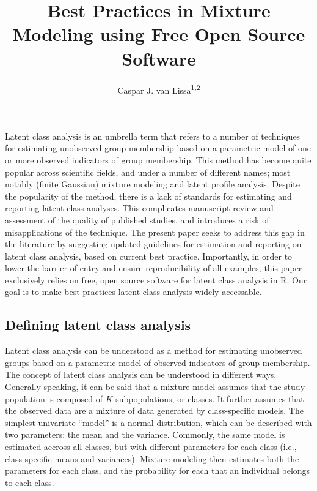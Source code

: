 \documentclass[
  ,man]{apa6}
\title{Best Practices in Mixture Modeling using Free Open Source Software}
\author{Caspar J. van Lissa\textsuperscript{1,2}}
\date{}
\affiliation{\vspace{0.5cm}\textsuperscript{1} Utrecht University, Methodology \& Statistics\\\textsuperscript{2} Open Science Community Utrecht}
\begin{document}
\maketitle

Latent class analysis is an umbrella term that refers to a number of techniques for estimating unobserved group membership
based on a parametric model of one or more observed indicators of group membership.
This method has become quite popular across scientific fields, and under a number of different names; most notably (finite Gaussian) mixture modeling and latent profile analysis.
Despite the popularity of the method, there is a lack of standards for estimating and reporting latent class analyses.
This complicates manuscript review and assessment of the quality of published studies,
and introduces a risk of misapplications of the technique.
The present paper seeks to address this gap in the literature by suggesting updated guidelines for estimation and reporting on latent class analysis, based on current best practice.
Importantly, in order to lower the barrier of entry and ensure reproducibility of all examples, this paper exclusively relies on free, open source software for latent class analysis in R.
Our goal is to make best-practices latent class analysis widely accessable.

\hypertarget{defining-latent-class-analysis}{%
\subsection{Defining latent class analysis}\label{defining-latent-class-analysis}}

Latent class analysis can be understood as a method for estimating unobserved groups
based on a parametric model of observed indicators of group membership.
The concept of latent class analysis can be understood in different ways.
Generally speaking, it can be said that a mixture model assumes that the study population
is composed of \(K\) subpopulations, or classes.
It further assumes that the observed data are a mixture of data generated by class-specific models.
The simplest univariate ``model'' is a normal distribution, which can be described with two parameters:
the mean and the variance.
Commonly, the same model is estimated accross all classes, but with different parameters for each class (i.e., class-specific means and variances).
Mixture modeling then estimates both the parameters for each class, and the probability for each that an individual belongs to each class.
\end{document}
